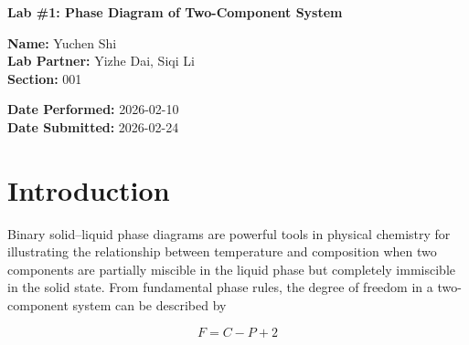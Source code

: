 \documentclass[12pt]{article}
\begin{document}
\begin{center}
    \Large \textbf{Lab \#1: Phase Diagram of Two-Component System}
\end{center}
\vspace{0.5em}

\noindent
\begin{minipage}[t]{0.5\textwidth}
    \small
    \textbf{Name:} Yuchen Shi \\
    \textbf{Lab Partner:} Yizhe Dai, Siqi Li \\ 
    \textbf{Section:} 001
\end{minipage}%
\begin{minipage}[t]{0.5\textwidth}
    \small \raggedleft
    \textbf{Date Performed:} 2026-02-10 \\ 
    \textbf{Date Submitted:} 2026-02-24 
\end{minipage}
\vspace{1.5em}

\begin{abstract}
The solid-liquid phase diagram of the naphthalene-biphenyl system was constructed using linear regression analysis on temperature-time cooling plots of pure and mixture of two-component system. Assuming ideal behavior, linear regression yielded pure melting points and enthalpies of fusion of $351.42\pm4.7$ K and $21.42\pm6.3$ kJ/mol for naphthalene; 341.26 K and 20.56 kJ/mol for biphenyl. The experimental eutectic point was located at $311.81\pm0.80$ K with a biphenyl mole fraction of $0.530 \pm 0.010$. These experimental values showed high agreement with literature values with relative errors ranging from 0.25\% to 12.67\%, and the eutectic composition deviating by only 1.79\%, validating the ideal solution model for this binary organic system.
\end{abstract}


\section*{Introduction}
Binary solid–liquid phase diagrams are powerful tools in physical chemistry for illustrating the relationship between temperature and composition when two components are partially miscible in the liquid phase but completely immiscible in the solid state. From fundamental phase rules, the degree of freedom in a two-component system can be described by 

\begin{equation}
F=C-P+2
\label{eq:vantHoff}
\end{equation}
\end{document}
